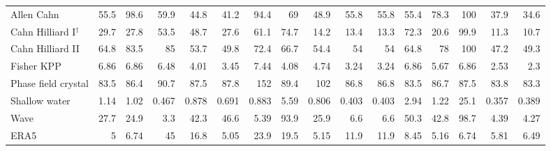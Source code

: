 \begin{tabular}{lrrrrrrrrrrrrrrr}
Allen Cahn & 55.5 & 98.6 & 59.9 & 44.8 & 41.2 & 94.4 & 69 & 48.9 & 55.8 & 55.8 & 55.4 & 78.3 & 100 & 37.9 & 34.6 \\
Cahn Hilliard I$^{\dagger}$ & 29.7 & 27.8 & 53.5 & 48.7 & 27.6 & 61.1 & 74.7 & 14.2 & 13.4 & 13.3 & 72.3 & 20.6 & 99.9 & 11.3 & 10.7 \\
Cahn Hilliard II & 64.8 & 83.5 & 85 & 53.7 & 49.8 & 72.4 & 66.7 & 54.4 & 54 & 54 & 64.8 & 78 & 100 & 47.2 & 49.3 \\
Fisher KPP & 6.86 & 6.86 & 6.48 & 4.01 & 3.45 & 7.44 & 4.08 & 4.74 & 3.24 & 3.24 & 6.86 & 5.67 & 6.86 & 2.53 & 2.3 \\
Phase field crystal & 83.5 & 86.4 & 90.7 & 87.5 & 87.8 & 152 & 89.4 & 102 & 86.8 & 86.8 & 83.5 & 86.7 & 87.5 & 83.8 & 83.3 \\
Shallow water & 1.14 & 1.02 & 0.467 & 0.878 & 0.691 & 0.883 & 5.59 & 0.806 & 0.403 & 0.403 & 2.94 & 1.22 & 25.1 & 0.357 & 0.389 \\
Wave & 27.7 & 24.9 & 3.3 & 42.3 & 46.6 & 5.39 & 93.9 & 25.9 & 6.6 & 6.6 & 50.3 & 42.8 & 98.7 & 4.39 & 4.27 \\
\midrule ERA5 & 5 & 6.74 & 45 & 16.8 & 5.05 & 23.9 & 19.5 & 5.15 & 11.9 & 11.9 & 8.45 & 5.16 & 6.74 & 5.81 & 6.49 \\
\bottomrule
\end{tabular}
